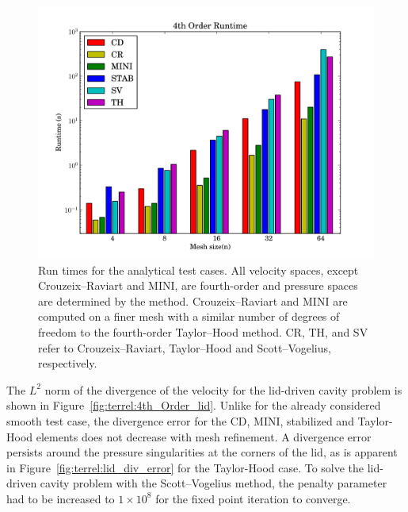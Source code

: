 \begin{figure}
  \center \includegraphics[width=\largefig]{chapters/terrel/pdf/run_4.pdf}
  \caption{Run times for the analytical test cases.  All velocity spaces,
    except Crouzeix--Raviart and MINI, are fourth-order and pressure
    spaces are determined by the method. Crouzeix--Raviart and MINI are
    computed on a finer mesh with a similar number of degrees of freedom
    to the fourth-order Taylor--Hood method. CR, TH, and SV refer to
    Crouzeix--Raviart, Taylor--Hood and Scott--Vogelius, respectively.}
  \label{fig:terrel:4th_Order:run}
\end{figure}

The $L^{2}$ norm of the divergence of the velocity for the lid-driven
cavity problem is shown in Figure~\ref{fig:terrel:4th_Order_lid}.
Unlike for the already considered smooth test case, the divergence
error for the CD, MINI, stabilized and Taylor-Hood elements does not
decrease with mesh refinement.  A divergence error persists around
the pressure singularities at the corners of the lid, as is apparent
in Figure~\ref{fig:terrel:lid_div_error} for the Taylor-Hood case.
To solve the lid-driven cavity problem with the Scott--Vogelius method,
the penalty parameter had to be increased to $1 \times 10^{8}$ for the
fixed point iteration to converge.

